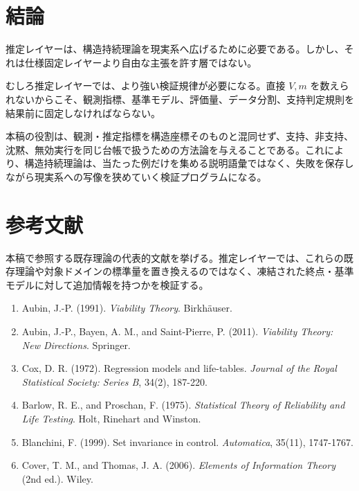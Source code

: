 \documentclass[12pt,a4paper]{article}
\begin{document}
\section{結論}\label{ux7d50ux8ad6}

推定レイヤーは、構造持続理論を現実系へ広げるために必要である。しかし、それは仕様固定レイヤーより自由な主張を許す層ではない。

むしろ推定レイヤーでは、より強い検証規律が必要になる。直接 \(V,m\) を数えられないからこそ、観測指標、基準モデル、評価量、データ分割、支持判定規則を結果前に固定しなければならない。

本稿の役割は、観測・推定指標を構造座標そのものと混同せず、支持、非支持、沈黙、無効実行を同じ台帳で扱うための方法論を与えることである。これにより、構造持続理論は、当たった例だけを集める説明語彙ではなく、失敗を保存しながら現実系への写像を狭めていく検証プログラムになる。

\section{参考文献}\label{ux53c2ux8003ux6587ux732e}

本稿で参照する既存理論の代表的文献を挙げる。推定レイヤーでは、これらの既存理論や対象ドメインの標準量を置き換えるのではなく、凍結された終点・基準モデルに対して追加情報を持つかを検証する。

\begin{enumerate}
\def\labelenumi{\arabic{enumi}.}
\tightlist
\item
  Aubin, J.-P. (1991). \emph{Viability Theory}. Birkhäuser.
\item
  Aubin, J.-P., Bayen, A. M., and Saint-Pierre, P. (2011). \emph{Viability Theory: New Directions}. Springer.
\item
  Cox, D. R. (1972). Regression models and life-tables. \emph{Journal of the Royal Statistical Society: Series B}, 34(2), 187-220.
\item
  Barlow, R. E., and Proschan, F. (1975). \emph{Statistical Theory of Reliability and Life Testing}. Holt, Rinehart and Winston.
\item
  Blanchini, F. (1999). Set invariance in control. \emph{Automatica}, 35(11), 1747-1767.
\item
  Cover, T. M., and Thomas, J. A. (2006). \emph{Elements of Information Theory} (2nd ed.). Wiley.
\end{enumerate}
\end{document}
